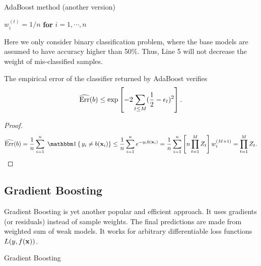\begin{algorithm}[H]
\caption{AdaBoost method (another version) \label{alg:adaboost2}}
\SetAlgoLined
 $w_i^{(t)} = 1/n$ \textbf{for} $i=1,\cdots,n$\;
\end{algorithm}
\remark Here we only consider binary classification problem, where the base models are assumed to have accuracy higher than 50\%. Thus, Line 5 will not decrease the weight of mis-classified samples.

\begin{theorem}The empirical error of the classifier returned by AdaBoost verifies
$$
\widehat{\mathrm{Err}}(b) \leq \exp\left[ -2 \sum_{t \leq M}(\frac{1}{2} - \epsilon_t)^2 \right].
$$
\end{theorem}
\begin{proof}
\begin{equation}
		\widehat{\mathrm{Err}}(b)=\frac{1}{n} \sum_{i=1}^{n} \Ind{y_{i} \neq b(\bfx_{i})} \leq \frac{1}{n} \sum_{i=1}^{n} e^{-y_{i} b(\bfx_{i})}=\frac{1}{n} \sum_{i=1}^{n}\left[n \prod_{t=1}^{M} Z_{t}\right] w^{(M+1)}_{i}=\prod_{t=1}^{M} Z_{t}.
\end{equation}

\end{proof}

\subsection{Gradient Boosting}
Gradient Boosting is yet another popular and efficient approach. It uses gradients (or residuals) instead of sample weights. The final predictions are made from weighted sum of weak models. It works for arbitrary differentiable loss functions $L(y, f(\mathbf{x}))$.

\begin{algorithm}[H]
\caption{Gradient Boosting \label{alg:gb}}
\SetAlgoLined
\end{algorithm}

